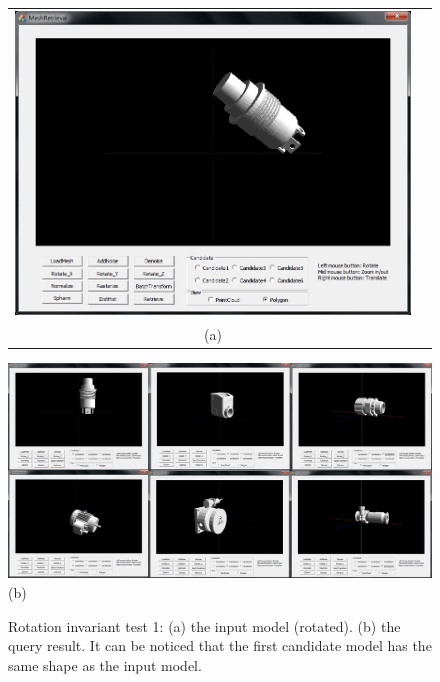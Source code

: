 \begin{figure}
\begin{center}
\begin{tabular}{cc}   %
   \includegraphics[width=0.6\linewidth]{input_rotationinvariant_test10}  \\
   (a) \\
\end{tabular}
   \includegraphics[width=1\linewidth]{output_rotationinvariant_test10}  \\
   (b)  \\
\caption{Rotation invariant test 1: (a) the input model (rotated). (b) the query result. It can be noticed that the first candidate model has the same shape as the input model.} 
  \label{noiseinvarianttest_UI1}
\end{center}
\end{figure}

